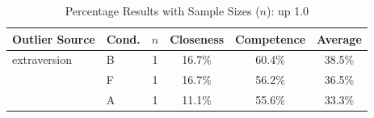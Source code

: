 \begin{table}[ht]
    \centering
    \caption{Percentage Results with Sample Sizes ($n$): up 1.0}
    \begin{tabular}{l l c c c c}
        \toprule
        \textbf{Outlier Source} & \textbf{Cond.} & \textbf{$n$} & \textbf{Closeness} & \textbf{Competence} & \textbf{Average} \\
        \midrule
        extraversion & B & 1 & 16.7\% & 60.4\% & 38.5\% \\
         & F & 1 & 16.7\% & 56.2\% & 36.5\% \\
         & A & 1 & 11.1\% & 55.6\% & 33.3\% \\
        \bottomrule
    \end{tabular}
\end{table}